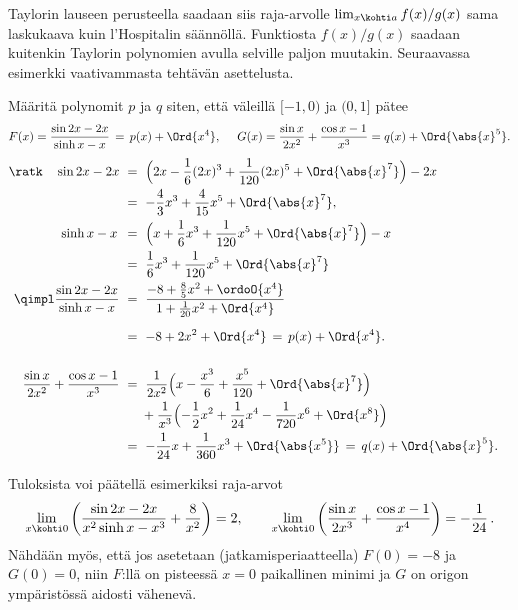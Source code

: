 Taylorin lauseen perusteella saadaan siis raja-arvolle $\lim_{x \kohti a} f(x)/g(x)$ sama
laskukaava kuin l'Hospitalin säännöllä. Funktiosta $f(x)/g(x)$ saadaan kuitenkin Taylorin
polynomien avulla selville paljon muutakin. Seuraavassa esimerkki vaativammasta tehtävän
asettelusta.
\begin{Exa} Määritä polynomit $p$ ja $q$ siten, että väleillä $[-1,0)$ ja $(0,1]$ pätee
\[
F(x)=\frac{\sin 2x-2x}{\sinh x-x} \,=\, p(x)+\Ord{x^4},\quad\ 
G(x)=\frac{\sin x}{2x^2}+\frac{\cos x -1}{x^3}=q(x)+\Ord{\abs{x}^5}.
\]
\begin{align*}
\text{\ratk} \quad  \sin 2x -2x\
         &=\ \Bigl(2x-\frac{1}{6}(2x)^3+\frac{1}{120}(2x)^5+\Ord{\abs{x}^7}\Bigr)-2x 
                                                                           \hspace{2cm} \\
         &=\ -\frac{4}{3}x^3+\frac{4}{15}x^5+\Ord{\abs{x}^7}, \\
\sinh x -x \,\ 
         &=\ \Bigl(x+\frac{1}{6}x^3+\frac{1}{120}x^5+\Ord{\abs{x}^7}\Bigr)-x \\
         &=\ \frac{1}{6}x^3+\frac{1}{120}x^5+\Ord{\abs{x}^7} \\
\qimpl \frac{\sin 2x-2x}{\sinh x-x}\ 
         &=\ \frac{-8+\frac{8}{5}x^2+\ordoO{x^4}}{1+\frac{1}{20}x^2+\Ord{x^4}} \\[2mm]
         &=\ -8+2x^2+\Ord{x^4} \,=\, p(x)+\Ord{x^4}. \\[5mm]
\frac{\sin x}{2x^2}+\frac{\cos x -1}{x^3}\ 
         &=\ \frac{1}{2x^2}\Bigl(x-\frac{x^3}{6}+\frac{x^5}{120}+\Ord{\abs{x}^7}\Bigr) \\
         & \quad\ + \frac{1}{x^3}\Bigl(-\frac{1}{2}x^2 +\frac{1}{24}x^4-\frac{1}{720}x^6 + 
                                                      \Ord{x^8}\Bigr) \\
         &=\ -\frac{1}{24}x+\frac{1}{360}x^3+\Ord{\abs{x^5}} \,=\, q(x)+\Ord{\abs{x}^5}.
\end{align*}

\vspace{2mm}

Tuloksista voi päätellä esimerkiksi raja-arvot
\[
\lim_{x\kohti 0}\left(\frac{\sin 2x-2x}{x^2\sinh x-x^3}+\frac{8}{x^2}\right) = 2, \qquad 
\lim_{x\kohti 0} \left(\frac{\sin x}{2x^3}+\frac{\cos x -1}{x^4}\right)=-\frac{1}{24}\,.
\]
Nähdään myös, että jos asetetaan (jatkamisperiaatteella) $F(0)=-8$ ja $G(0)=0$, niin $F$:llä
on pisteessä $x=0$ paikallinen minimi ja $G$ on origon ympäristössä aidosti vähenevä. \loppu
\end{Exa}

